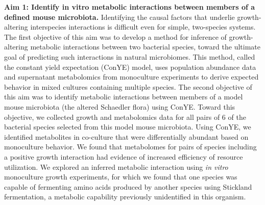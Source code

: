 \documentclass[11pt,twocolumn,notitlepage,openany,twoside]{book}
\begin{document}
\begin{refsection}
\textbf{Aim 1: Identify in vitro metabolic interactions between members of a defined mouse microbiota.} Identifying the causal factors that underlie growth-altering interspecies interactions is difficult even for simple, two-species systems. The first objective of this aim was to develop a method for inference of growth-altering metabolic interactions between two bacterial species, toward the ultimate goal of predicting such interactions in natural microbiomes. This method, called the constant yield expectation (ConYE) model, uses population abundance data and supernatant metabolomics from monoculture experiments to derive expected behavior in mixed cultures containing multiple species. The second objective of this aim was to identify metabolic interactions between members of a model mouse microbiota (the altered Schaedler flora) using ConYE. Toward this objective, we collected growth and metabolomics data for all pairs of 6 of the bacterial species selected from this model mouse microbiota. Using ConYE, we identified metabolites in co-culture that were differentially abundant based on monoculture behavior. We found that metabolomes for pairs of species including a positive growth interaction had evidence of increased efficiency of resource utilization. We explored an inferred metabolic interaction using \textit{in vitro} monoculture growth experiments, for which we found that one species was capable of fermenting amino acids produced by another species using Stickland fermentation, a metabolic capability previously unidentified in this organism. \\[12pt]



\end{refsection}
\end{document}

